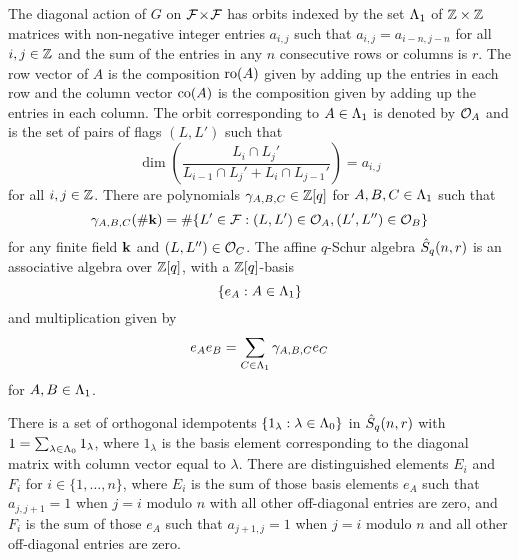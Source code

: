 \documentclass[a4paper, 11pt]{report}
\begin{document}
The diagonal action of $G$ on ${\mathcal{F}\!\times\!\mathcal{F}}$ has orbits indexed by the set $\Lambda_1{}$ of $\mathbb{Z}\times\mathbb{Z}$ matrices with non-negative integer entries $a_{i,j}$ such that $a_{i,j}=a_{i-n,j-n}$ for all $i,j\in\mathbb{Z}$ and the sum of the entries in any $n$ consecutive rows or columns is $r$. The row vector of $A$ is the composition $\operatorname{ro}(A)$ given by adding up the entries in each row and the column vector $\operatorname{co}(A)$ is the composition given by adding up the entries in each column. The orbit corresponding to $A\in\Lambda_1{}$ is denoted by $\mathcal{O}_{A}$ and is the set of pairs of flags $(L,L')$ such that
\begin{equation*}
\dim\left(\frac{L_i\cap L_j'}{L_{i-1}\cap L_j' + L_i\cap L_{j-1}'}\right) = a_{i,j}
\end{equation*}
for all $i,j\in\mathbb{Z}$. There are polynomials $\gamma_{A,B,C}\in\mathbb{Z}[q]$ for $A,B,C\in\Lambda_1{}$ such that
\begin{equation*}
\gamma_{A,B,C}(\#\mathbf{k}) = \#\{L'\in\mathcal{F}: (L,L')\in\mathcal{O}_{A}, (L',L'')\in\mathcal{O}_{B}\}
\end{equation*}
for any finite field $\mathbf{k}$ and $(L,L'')\in\mathcal{O}_{C}$. The affine $q$-Schur algebra $\hat{S}_q(n,r)$ is an associative algebra over $\mathbb{Z}[q]$, with a $\mathbb{Z}[q]$-basis
\begin{equation*}
\{e_A:A\in\Lambda_1{}\}
\end{equation*}
and multiplication given by
\begin{equation*}
e_A e_B = \sum_{C\in\Lambda_1{}} \gamma_{A,B,C}e_C
\end{equation*}
for $A,B\in\Lambda_1{}$.

There is a set of orthogonal idempotents $\{1_\lambda:\lambda\in\Lambda_0{}\}$ in $\hat{S}_q(n,r)$ with $1=\sum_{\lambda\in\Lambda_0{}} 1_\lambda$, where $1_\lambda$ is the basis element corresponding to the diagonal matrix with column vector equal to $\lambda$. There are distinguished elements $E_i$ and $F_i$ for $i\in\{1,\ldots,n\}$, where $E_i$ is the sum of those basis elements $e_A$ such that $a_{j,j+1}=1$ when $j=i$ modulo $n$ with all other off-diagonal entries are zero, and $F_i$ is the sum of those $e_A$ such that $a_{j+1,j}=1$ when $j=i$ modulo $n$ and all other off-diagonal entries are zero.
\end{document}
